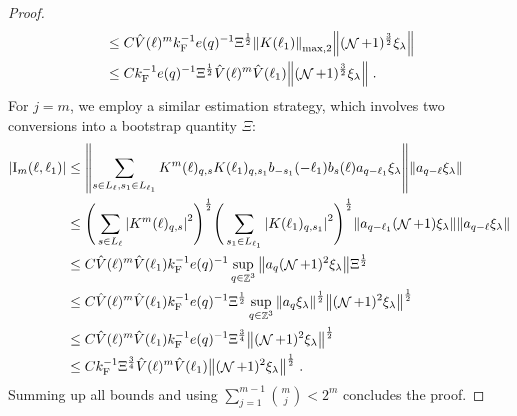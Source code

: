 \documentclass[12pt,a4paper]{article}
\numberwithin{equation}{section}
\newcommand{\1}{\mathbb{I}}
\newcommand{\F}{\mathrm{F}}
\newcommand{\I}{\mathrm{I}}
\DeclareMathOperator{\Z}{\mathbb{Z}}
\DeclareMathOperator{\NN}{\mathcal{N}}
\newcommand{\half}{\frac{1}{2}}
\theoremstyle{plain}
\theoremstyle{definition}
\theoremstyle{remark}
\theoremstyle{plain}
\theoremstyle{definition}
\theoremstyle{remark}
\begin{document}
\begin{proof}
\begin{align}
	&\leq C \hat{V}(\ell)^m k_{\F}^{-1} e(q)^{-1} \Xi^\half
		\norm{ K(\ell_1)}_{\mathrm{max,2}}
		\norm{(\NN+1)^\frac{3}{2} \xi_\lambda} \nonumber \\
	&\leq C k_{\F}^{-1} e(q)^{-1} \Xi^\half 
		\hat{V}(\ell)^{m}
		\hat{V}(\ell_1)
		\norm{(\NN+1)^\frac{3}{2} \xi_\lambda} \;. \label{eq:estEQ1112}
\end{align}
For $ j = m $, we employ a similar estimation strategy, which involves two conversions into a bootstrap quantity $ \Xi $:
\begin{align}
	|\I_m(\ell, \ell_1)|
	&\leq \norm{ \sum\limits_{s\in L_{\ell}, s_1 \in L_{\ell_1}} K^m(\ell)_{q,s}K(\ell_1)_{q,s_1} b_{-s_1}(-\ell_1) b_{s}(\ell) a_{q-\ell_1}\xi_\lambda}\norm{ a_{q-\ell}\xi_\lambda }\nonumber\\
	&\leq \Bigg(\sum\limits_{s \in L_{\ell}} \abs{K^m(\ell)_{q,s}}^2\Bigg)^\half \Bigg(\sum\limits_{s_1 \in L_{\ell_1}} \abs{K(\ell_1)_{q,s_1}}^2\Bigg)^\half \norm{ a_{q-\ell_1} (\NN+1)\xi_\lambda} \norm{ a_{q-\ell}\xi_\lambda }\nonumber\\
	&\leq C \hat{V}(\ell)^m \hat{V}(\ell_1) k_{\F}^{-1} e(q)^{-1} \sup_{q \in \Z^3}\norm{ a_{q} (\NN+1)^2\xi_\lambda}\Xi^\half\nonumber\\
	&\leq C \hat{V}(\ell)^m \hat{V}(\ell_1) k_{\F}^{-1} e(q)^{-1} \Xi^\half \sup_{q \in \Z^3}\norm{ a_{q} \xi_\lambda}^\half \norm{ (\NN+1)^2\xi_\lambda}^\half \nonumber\\
	&\leq C \hat{V}(\ell)^m \hat{V}(\ell_1) k_{\F}^{-1} e(q)^{-1} \Xi^{\frac{3}{4}}
		\norm{(\NN+1)^2\xi_\lambda}^\half \nonumber \\
	&\leq C k_{\F}^{-1}\Xi^{\frac{3}{4}} 
		\hat{V}(\ell)^m
		\hat{V}(\ell_1)
		\norm{ (\NN+1)^2\xi_\lambda}^\half \;. \label{eq:estEQ1113}
\end{align}
Summing up all bounds and using $\sum_{j=1}^{m-1} {{m}\choose j} < 2^m $ concludes the proof.
\end{proof}
\end{document}
